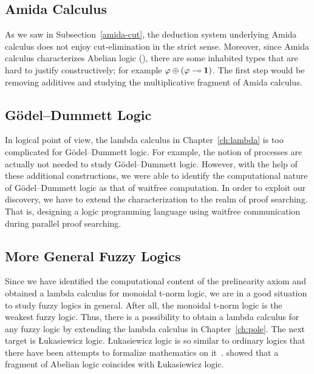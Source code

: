 \subsection{Amida Calculus}

As we saw in Subsection~\ref{amida-cut},
the deduction system underlying Amida calculus does not enjoy
cut-elimination in the strict sense.
Moreover, since Amida calculus characterizes Abelian logic
(),
there are some inhabited types that are hard to justify constructively;
for example $\varphi\oplus(\varphi\multimap\mathbf{1})$.
The first step would be removing additives and studying the
multiplicative fragment of Amida calculus.

\subsection{G\"odel--Dummett Logic}

In logical point of view, the lambda calculus in Chapter~\ref{ch:lambda}
is too complicated for G\"odel--Dummett logic.
For example, the notion of processes are actually not needed to study
G\"odel--Dummett logic.  However, with the help of these additional
constructions,
we were able to identify the computational nature of G\"odel--Dummett
logic as that of waitfree computation.
In order to exploit our discovery, we have to extend the
characterization to the realm of proof searching.  That is, designing a
logic programming language using waitfree communication during parallel
proof searching.

\subsection{More General Fuzzy Logics}

Since we have identified the computational content of the prelinearity
axiom and obtained a lambda calculus for monoidal t-norm logic, we are
in a good situation to study fuzzy logics in general.
After all, the monoidal t-norm logic is the weakest fuzzy logic.
Thus, there is a possibility to obtain a lambda calculus for any fuzzy
logic by extending the lambda calculus in Chapter~\ref{ch:pole}.
The next target is \L{}ukasiewicz logic.  \L{}ukasiewicz logic is so
similar to ordinary logics that there have been attempts to formalize
mathematics on
it~\citep{Hajek:TheJournalOfSymbolicLogic:2000,hajek2005,yatabe2009}.
\citet[Theorem~9]{metcalfe2002} showed that a fragment of Abelian logic
coincides with \L{}ukasiewicz logic.

